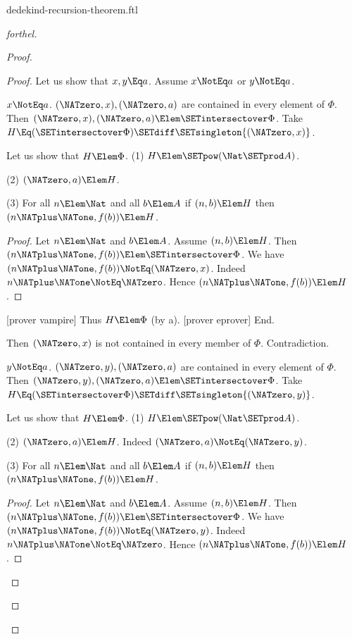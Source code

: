 \documentclass{stex}
\begin{document}
\begin{smodule}{dedekind-recursion-theorem.ftl}
\begin{proof}[forthel]
\begin{proof}
\begin{proof}
        Let us show that $x, y \Eq a$.
          Assume $x \NotEq a$ or $y \NotEq a$.

          \begin{case}{$x \NotEq a$.}
            $(\NATzero,x), (\NATzero,a)$ are contained in every element of $\Phi$.
            Then $(\NATzero,x), (\NATzero,a) \Elem \SETintersectover \Phi$.
            Take $H \Eq (\SETintersectover \Phi) \SETdiff \SETsingleton{(\NATzero,x)}$.

            Let us show that $H \Elem \Phi$.
              (1) $H \Elem \SETpow(\Nat \SETprod A)$.

              (2) $(\NATzero,a) \Elem H$.

              (3) For all $n \Elem \Nat$ and all $b \Elem A$ if
              $(n,b) \Elem H$ then $(n \NATplus \NATone, f(b)) \Elem H$.
              \begin{proof}
                Let $n \Elem \Nat$ and $b \Elem A$.
                Assume $(n,b) \Elem H$.
                Then $(n \NATplus \NATone, f(b)) \Elem \SETintersectover \Phi$.
                We have $(n \NATplus \NATone, f(b)) \NotEq (\NATzero,x)$.
                Indeed $n \NATplus \NATone \NotEq \NATzero$.
                Hence $(n \NATplus \NATone, f(b)) \Elem H$.
              \end{proof}

              [prover vampire]
              Thus $H \Elem \Phi$ (by a).
              [prover eprover]
            End.

            Then $(\NATzero,x)$ is not contained in every member of $\Phi$.
            Contradiction.
          \end{case}

          \begin{case}{$y \NotEq a$.}
            $(\NATzero,y), (\NATzero,a)$ are contained in every element of $\Phi$.
            Then $(\NATzero,y), (\NATzero,a) \Elem \SETintersectover \Phi$.
            Take $H \Eq (\SETintersectover \Phi) \SETdiff \SETsingleton{(\NATzero,y)}$.

            Let us show that $H \Elem \Phi$.
              (1) $H \Elem \SETpow(\Nat \SETprod A)$.

              (2) $(\NATzero,a) \Elem H$.
              Indeed $(\NATzero,a) \NotEq (\NATzero,y)$.

              (3) For all $n \Elem \Nat$ and all $b \Elem A$ if
              $(n,b) \Elem H$ then $(n \NATplus \NATone, f(b)) \Elem H$.
              \begin{proof}
                Let $n \Elem \Nat$ and $b \Elem A$.
                Assume $(n,b) \Elem H$.
                Then $(n \NATplus \NATone, f(b)) \Elem \SETintersectover \Phi$.
                We have $(n \NATplus \NATone, f(b)) \NotEq (\NATzero,y)$.
                Indeed $n \NATplus \NATone \NotEq \NATzero$.
                Hence $(n \NATplus \NATone, f(b)) \Elem H$.
              \end{proof}


\end{case}
\end{proof}
\end{proof}
\end{proof}
\end{smodule}
\end{document}
